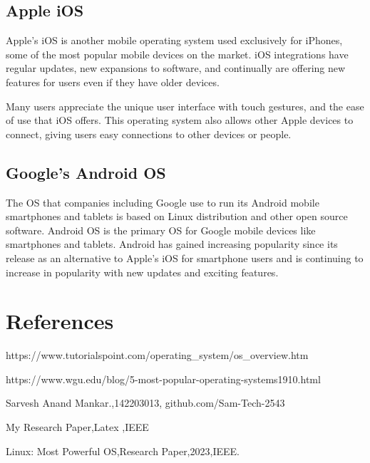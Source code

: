 \documentclass[12pt]{article}
\begin{document}
\subsection{Apple iOS}
Apple's iOS is another mobile operating system used exclusively for iPhones, some of the most popular mobile devices on the market. iOS integrations have regular updates, new expansions to software, and continually are offering new features for users even if they have older devices. 

Many users appreciate the unique user interface with touch gestures, and the ease of use that iOS offers. This operating system also allows other Apple devices to connect, giving users easy connections to other devices or people.

\subsection{Google's Android OS}
The OS that companies including Google use to run its Android mobile smartphones and tablets is based on Linux distribution and other open source software. Android OS is the primary OS for Google mobile devices like smartphones and tablets. Android has gained increasing popularity since its release as an alternative to Apple’s iOS for smartphone users and is continuing to increase in popularity with new updates and exciting features.

\clearpage %

\section{References}
\begin{thebibliography} {}

https://www.tutorialspoint.com/operating\_system/os\_overview.htm

 https://www.wgu.edu/blog/5-most-popular-operating-systems1910.html

 Sarvesh Anand Mankar.,142203013, github.com/Sam-Tech-2543

 My Research Paper,Latex ,IEEE

 Linux: Most Powerful OS,Research Paper,2023,IEEE.

\end{thebibliography} 

\printbibliography 
\end{document}
